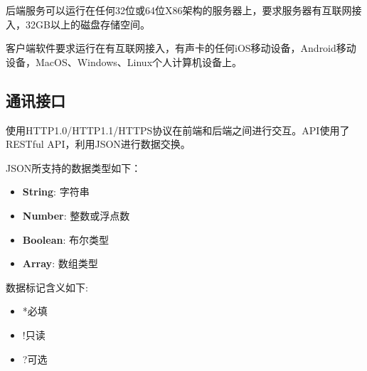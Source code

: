 后端服务可以运行在任何32位或64位X86架构的服务器上，要求服务器有互联网接入，32GB以上的磁盘存储空间。

客户端软件要求运行在有互联网接入，有声卡的任何iOS移动设备，Android移动设备，MacOS、Windows、Linux个人计算机设备上。


\subsection{通讯接口}

使用HTTP1.0/HTTP1.1/HTTPS协议在前端和后端之间进行交互。API使用了RESTful API，利用JSON进行数据交换。

JSON所支持的数据类型如下：
\begin{itemize}
	\item \textbf{String}: 字符串
	\item \textbf{Number}: 整数或浮点数
	\item \textbf{Boolean}: 布尔类型
	\item \textbf{Array}: 数组类型
\end{itemize}

数据标记含义如下:
\begin{itemize}
	\item *必填
	\item !只读
	\item ?可选
\end{itemize}

